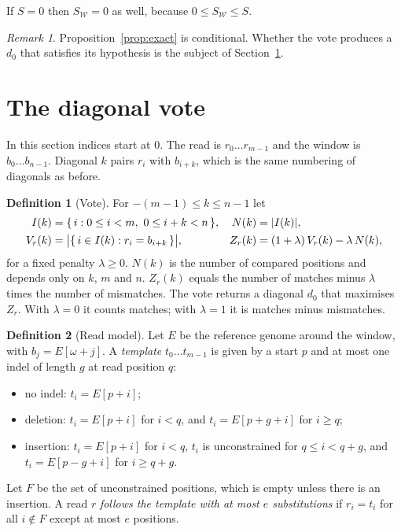 \documentclass[11pt]{article}
\theoremstyle{plain}
\theoremstyle{definition}
\newtheorem*{definition}{Definition}
\theoremstyle{remark}
\newtheorem*{remark}{Remark}
\DeclarePairedDelimiter{\abs}{\lvert}{\rvert}
\newcommand{\W}{\mathcal{W}}
\begin{document}
If $S = 0$ then $S_{\W} = 0$ as well, because $0 \le S_{\W} \le S$.

\begin{remark}
Proposition~\ref{prop:exact} is conditional. Whether the vote produces a $d_0$
that satisfies its hypothesis is the subject of Section~\ref{sec:vote}.
\end{remark}

\section{The diagonal vote}\label{sec:vote}

In this section indices start at $0$. The read is $r_0 \dots r_{m-1}$ and the
window is $b_0 \dots b_{n-1}$. Diagonal $k$ pairs $r_i$ with $b_{i+k}$, which is
the same numbering of diagonals as before.

\begin{definition}[Vote]
For $-(m-1) \le k \le n-1$ let
\begin{align*}
I(k) &= \{\, i : 0 \le i < m,\ 0 \le i + k < n \,\}, & N(k) &= \abs{I(k)},\\
V_r(k) &= \abs[\big]{\{\, i \in I(k) : r_i = b_{i+k} \,\}}, &
Z_r(k) &= (1+\lambda)\,V_r(k) - \lambda\,N(k),
\end{align*}
for a fixed penalty $\lambda \ge 0$. $N(k)$ is the number of compared positions
and depends only on $k$, $m$ and $n$. $Z_r(k)$ equals the number of matches
minus $\lambda$ times the number of mismatches. The vote returns a diagonal
$d_0$ that maximises $Z_r$. With $\lambda = 0$ it counts matches; with
$\lambda = 1$ it is matches minus mismatches.
\end{definition}

\begin{definition}[Read model]
Let $E$ be the reference genome around the window, with $b_j = E[\omega + j]$. A
\emph{template} $t_0 \dots t_{m-1}$ is given by a start $p$ and at most one
indel of length $g$ at read position $q$:
\begin{itemize}[nosep]
\item no indel: $t_i = E[p+i]$;
\item deletion: $t_i = E[p+i]$ for $i < q$, and $t_i = E[p+g+i]$ for $i \ge q$;
\item insertion: $t_i = E[p+i]$ for $i < q$, $t_i$ is unconstrained for
      $q \le i < q+g$, and $t_i = E[p-g+i]$ for $i \ge q+g$.
\end{itemize}
Let $F$ be the set of unconstrained positions, which is empty unless there is an
insertion. A read $r$ \emph{follows the template with at most $e$ substitutions}
if $r_i = t_i$ for all $i \notin F$ except at most $e$ positions.
\end{definition}
\end{document}
